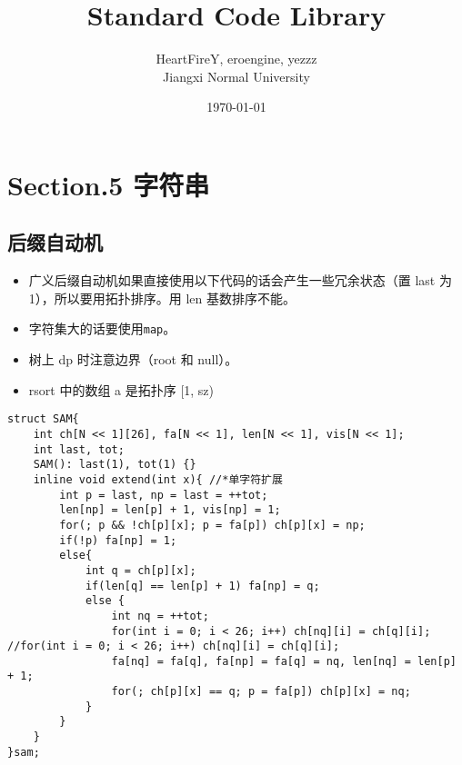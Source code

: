 \documentclass[]{article}
\date{}
\title{\vspace{50mm} \huge Standard Code Library \\[20pt]}
\author{HeartFireY, eroengine, yezzz \\[10pt] Jiangxi Normal University}
\date{\today}
\providecommand{\tightlist}{%
  \setlength{\itemsep}{0pt}\setlength{\parskip}{0pt}}
\begin{document}
\begin{titlepage}

\maketitle

\end{titlepage}

\newpage

\renewcommand\labelitemi{$\bullet$}

{
\setcounter{tocdepth}{3}
\tableofcontents
\newpage
}








\hypertarget{section.5-ux5b57ux7b26ux4e32}{%
\section{Section.5 字符串}\label{section.5-ux5b57ux7b26ux4e32}}

\hypertarget{ux540eux7f00ux81eaux52a8ux673a}{%
\subsection{后缀自动机}\label{ux540eux7f00ux81eaux52a8ux673a}}

\begin{itemize}
\tightlist
\item
  广义后缀自动机如果直接使用以下代码的话会产生一些冗余状态（置 last 为
  1），所以要用拓扑排序。用 len 基数排序不能。
\item
  字符集大的话要使用\texttt{map}。
\item
  树上 dp 时注意边界（root 和 null）。
\item
  rsort 中的数组 a 是拓扑序 {[}1, sz)
\end{itemize}

\begin{verbatim}
struct SAM{
    int ch[N << 1][26], fa[N << 1], len[N << 1], vis[N << 1];
    int last, tot;
    SAM(): last(1), tot(1) {}
    inline void extend(int x){ //*单字符扩展
        int p = last, np = last = ++tot;
        len[np] = len[p] + 1, vis[np] = 1;
        for(; p && !ch[p][x]; p = fa[p]) ch[p][x] = np;
        if(!p) fa[np] = 1;
        else{
            int q = ch[p][x];
            if(len[q] == len[p] + 1) fa[np] = q;
            else {
                int nq = ++tot;
                for(int i = 0; i < 26; i++) ch[nq][i] = ch[q][i]; //for(int i = 0; i < 26; i++) ch[nq][i] = ch[q][i];
                fa[nq] = fa[q], fa[np] = fa[q] = nq, len[nq] = len[p] + 1;
                for(; ch[p][x] == q; p = fa[p]) ch[p][x] = nq;
            }
        }
    }
}sam;
\end{verbatim}
\end{document}
